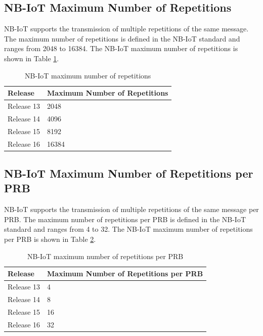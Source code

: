 \subsection{NB-IoT Maximum Number of Repetitions}
NB-IoT supports the transmission of multiple repetitions of the same message. The maximum number of repetitions is defined in the NB-IoT standard and ranges from 2048 to 16384. The NB-IoT maximum number of repetitions is shown in Table \ref{tab:nb-iot-maximum-number-of-repetitions}.
\begin{table}[ht]
    \centering
    \begin{tabular}{|l|l|}
        \hline
        \textbf{Release} & \textbf{Maximum Number of Repetitions} \\ \hline
        Release 13 & 2048 \\ \hline
        Release 14 & 4096 \\ \hline
        Release 15 & 8192 \\ \hline
        Release 16 & 16384 \\ \hline
    \end{tabular}
    \caption{NB-IoT maximum number of repetitions \cite{nb-iot-maximum-number-of-repetitions}}
    \label{tab:nb-iot-maximum-number-of-repetitions}
\end{table}

\subsection{NB-IoT Maximum Number of Repetitions per PRB}
NB-IoT supports the transmission of multiple repetitions of the same message per PRB. The maximum number of repetitions per PRB is defined in the NB-IoT standard and ranges from 4 to 32. The NB-IoT maximum number of repetitions per PRB is shown in Table \ref{tab:nb-iot-maximum-number-of-repetitions-per-prb}.  
\begin{table}[ht]
    \centering
    \begin{tabular}{|l|l|}
        \hline
        \textbf{Release} & \textbf{Maximum Number of Repetitions per PRB} \\ \hline
        Release 13 & 4 \\ \hline
        Release 14 & 8 \\ \hline
        Release 15 & 16 \\ \hline
        Release 16 & 32 \\ \hline
    \end{tabular}
    \caption{NB-IoT maximum number of repetitions per PRB \cite{nb-iot-maximum-number-of-repetitions-per-prb}}
    \label{tab:nb-iot-maximum-number-of-repetitions-per-prb}    
\end{table}

